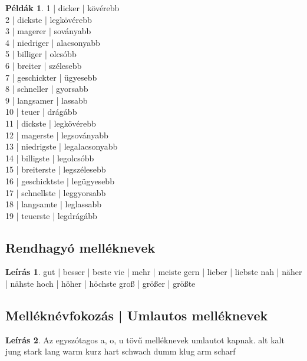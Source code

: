 \documentclass{article}
\theoremstyle{definition}
\newtheorem*{exmp}{Példák}
\newtheorem*{desc}{Leírás}
\begin{document}
\begin{exmp}
1 | dicker | kövérebb\\
2 | dickste | legkövérebb\\
3 | magerer | soványabb\\
4 | niedriger | alacsonyabb\\
5 | billiger | olcsóbb\\
6 | breiter | szélesebb\\
7 | geschickter | ügyesebb\\
8 | schneller | gyorsabb\\
9 | langsamer | lassabb\\
10 | teuer | drágább\\
11 | dickste | legkövérebb\\
12 | magerste | legsoványabb\\
13 | niedrigste | legalacsonyabb\\
14 | billigste | legolcsóbb\\
15 | breiterste | legszélesebb\\
16 | geschicktste | legügyesebb\\
17 | schnellste | leggyorsabb\\
18 | langsamte | leglassabb\\
19 | teuerste | legdrágább\\
\end{exmp}

\subsection{Rendhagyó melléknevek}

\begin{desc}
gut | besser | beste
vie | mehr | meiste
gern | lieber | liebste
nah | näher | nähste
hoch | höher | höchste
groß | größer | größte
\end{desc}

\subsection{Melléknévfokozás | Umlautos melléknevek}

\begin{desc}
Az egyszótagos a, o, u tövű melléknevek umlautot kapnak.
alt
kalt
jung
stark
lang
warm
kurz
hart
schwach
dumm
klug
arm
scharf
\end{desc}
\end{document}
